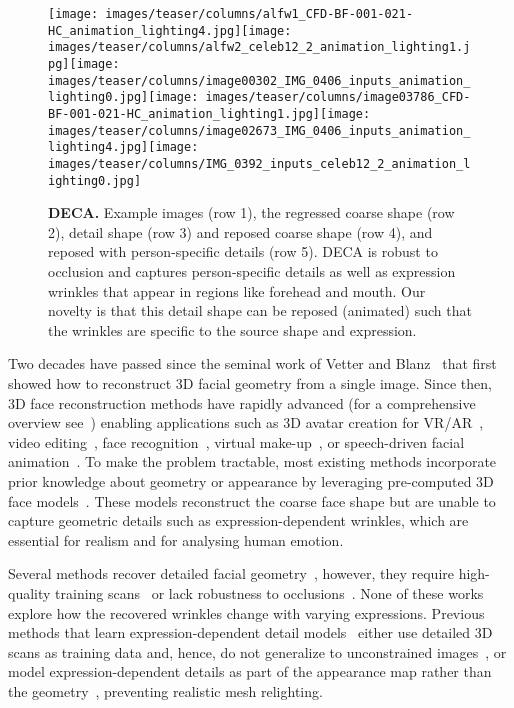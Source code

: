 \documentclass[final]{cvpr}
\newcommand{\modelname}{DECA\xspace}
\begin{document}
\begin{figure}[t]
    \centering
    \texttt{[image: images/teaser/columns/alfw1\_CFD-BF-001-021-HC\_animation\_lighting4.jpg]}\texttt{[image: images/teaser/columns/alfw2\_celeb12\_2\_animation\_lighting1.jpg]}\texttt{[image: images/teaser/columns/image00302\_IMG\_0406\_inputs\_animation\_lighting0.jpg]}\texttt{[image: images/teaser/columns/image03786\_CFD-BF-001-021-HC\_animation\_lighting1.jpg]}\texttt{[image: images/teaser/columns/image02673\_IMG\_0406\_inputs\_animation\_lighting4.jpg]}\texttt{[image: images/teaser/columns/IMG\_0392\_inputs\_celeb12\_2\_animation\_lighting0.jpg]}
	\caption{{\bf \modelname.}  Example images (row 1), the regressed coarse shape (row 2), detail shape (row 3) and reposed coarse shape (row 4), and reposed with person-specific details (row 5).
	\modelname is robust to occlusion and captures person-specific details as well as expression wrinkles that appear in regions like forehead and mouth.    
	Our novelty is that this detail shape can be reposed (animated) such that the wrinkles are specific to the source shape and expression.
	}
    \label{fig:teaser}
\end{figure}

Two decades have passed since the seminal work of Vetter and Blanz~\cite{VetterBlanz1998} that first showed how to reconstruct 3D facial geometry from a single image.
Since then, 3D face reconstruction methods have rapidly advanced (for a comprehensive overview see~\cite{Zollhoefer2018}) enabling applications such as 3D avatar creation for VR/AR~\cite{Hu2017}, video editing~\cite{Thies2016}, face recognition~\cite{Blanz2002,Romdhani2002}, virtual make-up~\cite{Scherbaum2011}, or speech-driven facial animation~\cite{VOCA2019}.
To make the problem tractable, most existing methods incorporate prior knowledge about geometry or appearance by leveraging pre-computed 3D face models~\cite{Brunton2014,Egger2020}. 
These models reconstruct the coarse face shape but are unable to capture geometric details such as expression-dependent wrinkles, which are essential for realism and for analysing human emotion.

Several methods recover detailed facial geometry~\cite{Abrevaya2020,Cao2015,Chen2019,Guo2018,Richardson2017,AnhTran2018,LuanTran2019}, however, they require high-quality training scans~\cite{Cao2015,Chen2019} or lack robustness to occlusions~\cite{Abrevaya2020,Guo2018,Richardson2017}. 
None of these works explore how the recovered wrinkles change with varying expressions. 
Previous methods that learn expression-dependent detail models~\cite{chaudhuri2020personalized,yang2020facescape} either use detailed 3D scans as training data and, hence, do not generalize to unconstrained images~\cite{yang2020facescape}, or model expression-dependent details as part of the appearance map rather than the geometry~\cite{chaudhuri2020personalized},  preventing realistic mesh relighting. 
\end{document}

